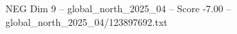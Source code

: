 \begin{textsample}{NEG Dim 9 – global\_north\_2025\_04 – Score -7.00 – global\_north\_2025\_04/123897692.txt}
\end{textsample}

